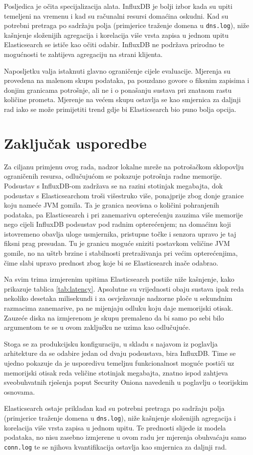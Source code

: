 Posljedica je očita specijalizacija alata. InfluxDB je bolji izbor kada su upiti temeljeni na vremenu i kad su računalni resursi domaćina oskudni. Kad su
potrebni pretraga po sadržaju polja (primjerice traženje domena u \texttt{dns.log}), niže kašnjenje složenijih agregacija i korelacija više vrsta
zapisa u jednom upitu Elasticsearch se ističe kao očiti odabir. InfluxDB ne podržava prirodno te mogućnosti te zahtijeva agregaciju na strani klijenta.

Naposljetku valja istaknuti glavno ograničenje cijele evaluacije. Mjerenja su provedena na malenom skupu podataka, pa pouzdano govore o fiksnim zapisima i
donjim granicama potrošnje, ali ne i o ponašanju sustava pri znatnom rastu količine prometa. Mjerenje na većem skupu ostavlja se kao smjernica za daljnji
rad iako se može primijetiti trend gdje bi Elasticsearch bio puno bolja opcija.

\section{Zaključak usporedbe}

Za ciljanu primjenu ovog rada, nadzor lokalne mreže na potrošačkom sklopovlju ograničenih resursa, odlučujućom se pokazuje potrošnja radne memorije. Podsustav s InfluxDB-om zadržava se na 
razini stotinjak megabajta, dok podsustav s Elasticsearchom troši višestruko više, ponajprije zbog donje granice koju nameće JVM gomila. Ta je granica neovisna o količini pohranjenih podataka, 
pa Elasticsearch i pri zanemarivu opterećenju zauzima više memorije nego cijeli InfluxDB podsustav pod radnim opterećenjem; na domaćinu koji istovremeno obavlja uloge usmjernika, pristupne točke 
i senzora upravo je taj fiksni prag presudan. Tu je granicu moguće sniziti postavkom veličine JVM gomile, no na uštrb brzine i stabilnosti pretraživanja pri većim opterećenjima, čime slabi upravo prednost zbog koje bi se Elasticsearch inače odabrao.

Na svim trima izmjerenim upitima Elasticsearch postiže niže kašnjenje, kako prikazuje tablica \ref{tab:latency}. Apsolutne su vrijednosti obaju sustava 
ipak reda nekoliko desetaka milisekundi i za osvježavanje nadzorne ploče u sekundnim razmacima zanemarive, pa ne mijenjaju odluku koju daje memorijski otisak. Zauzeće diska na izmjerenom je 
skupu premaleno da bi samo po sebi bilo argumentom te se u ovom zaključku ne uzima kao odlučujuće.

Stoga se za produkcijsku konfiguraciju, u skladu s najavom iz poglavlja arhitekture da se odabire jedan od dvaju podsustava, bira InfluxDB. Time se ujedno pokazuje da je usporedivu 
temeljnu funkcionalnost moguće postići uz memorijski otisak reda veličine stotinjak megabajta, znatno ispod zahtjeva sveobuhvatnih rješenja poput Security Oniona navedenih u poglavlju o 
teorijskim osnovama.

Elasticsearch ostaje prikladan kad su potrebni pretraga po sadržaju polja (primjerice traženje domena u \texttt{dns.log}), niže kašnjenje složenijih agregacija i korelacija više vrsta 
zapisa u jednom upitu. Te prednosti slijede iz modela podataka, no nisu zasebno izmjerene u ovom radu jer mjerenja obuhvaćaju samo \texttt{conn.log} te se njihova kvantifikacija ostavlja 
kao smjernica za daljnji rad.